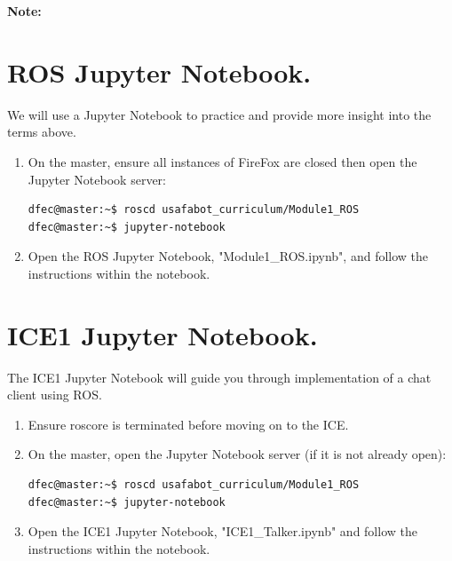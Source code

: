 \documentclass{handout}
\begin{document}
\textbf{Note:} 



\newpage
\clearpage
\pagebreak

\section{ROS Jupyter Notebook.}
We will use a Jupyter Notebook to practice and provide more insight into the terms above.

\begin{enumerate}
\item On the master, ensure all instances of FireFox are closed then open the Jupyter Notebook server:

\begin{lstlisting}[language=bash]
dfec@master:~$ roscd usafabot_curriculum/Module1_ROS
dfec@master:~$ jupyter-notebook
\end{lstlisting}

\item Open the ROS Jupyter Notebook, "Module1\_ROS.ipynb", and follow the instructions within the notebook.

\end{enumerate}

\section{ICE1 Jupyter Notebook.}
The ICE1 Jupyter Notebook will guide you through implementation of a chat client using ROS.

\begin{enumerate}\setlength\itemsep{1em}
	\item Ensure roscore is terminated before moving on to the ICE.
	\item On the master, open the Jupyter Notebook server (if it is not already open):
\begin{lstlisting}[language=bash]
dfec@master:~$ roscd usafabot_curriculum/Module1_ROS
dfec@master:~$ jupyter-notebook
\end{lstlisting}

\item Open the ICE1 Jupyter Notebook, "ICE1\_Talker.ipynb" and follow the instructions within the notebook. 
\end{enumerate}
\end{document}
